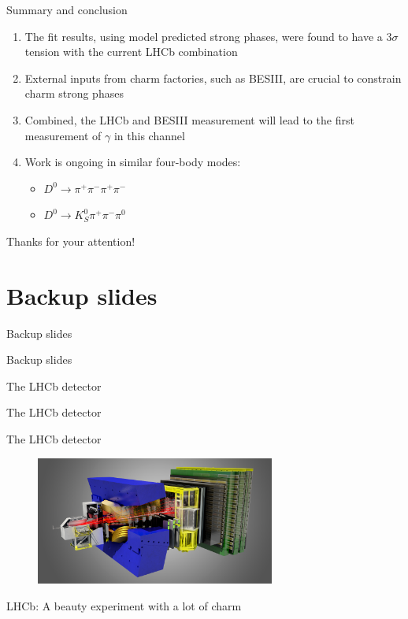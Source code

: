 \documentclass{beamer}
\begin{document}
\begin{frame}{Summary and conclusion}
  \begin{enumerate}
    \setlength\itemsep{1.0em}
    \setcounter{enumi}{4}
    \item{The fit results, using model predicted strong phases, were found to have a $3\sigma$ tension with the current LHCb combination}
    \item{External inputs from charm factories, such as BESIII, are crucial to constrain charm strong phases}
    \item{Combined, the LHCb and BESIII measurement will lead to the first measurement of $\gamma$ in this channel}
    \item{Work is ongoing in similar four-body modes:}
    \begin{itemize}
      \item{$D^0\to\pi^+\pi^-\pi^+\pi^-$}
      \item{$D^0\to K_S^0\pi^+\pi^-\pi^0$}
    \end{itemize}
  \end{enumerate}
  \vspace{0.2cm}
  \begin{center}
    {\huge Thanks for your attention!}
  \end{center}
\end{frame}

\section{Backup slides}
\begin{frame}{Backup slides}
  \begin{center}
    {\huge Backup slides}
  \end{center}
\end{frame}

\begin{frame}{The LHCb detector}
  \begin{center}
    {\huge The LHCb detector}
  \end{center}
\end{frame}

\begin{frame}{The LHCb detector}
  \begin{figure}
    \centering
    \includegraphics[width = 0.7\textwidth]{Plots/LHCbDetector.png}
  \end{figure}
  \begin{center}
    \Large LHCb: A beauty experiment with a lot of charm
  \end{center}
\end{frame}
\end{document}
